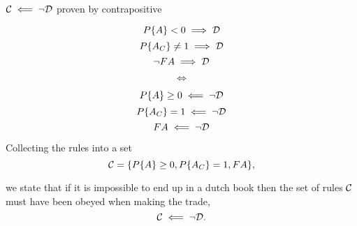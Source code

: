 \begin{frame}{$\mathcal{C}\impliedby\neg\mathcal{D}$ proven by contrapositive}
\begin{minipage}[]{\linewidth}
\begin{minipage}[]{0.45\linewidth}
$$P\{A\}<0\implies\mathcal{D}$$
$$P\{A_{C}\}\ne1\implies\mathcal{D}$$
$$\neg FA\implies \mathcal{D}$$
\end{minipage}
\hfill
\begin{minipage}{0.05\linewidth}
\centering
$$\iff$$
\end{minipage}
\hfill
\begin{minipage}[]{0.45\linewidth}
$$P\{A\}\ge0\impliedby\neg\mathcal{D}$$
$$P\{A_{C}\}=1\impliedby\neg\mathcal{D}$$
$$FA\impliedby \neg\mathcal{D}$$
\end{minipage}
\end{minipage}
\vfill
\begin{minipage}{\linewidth}
Collecting the rules into a set
\vspace{-7px}
$$\mathcal{C}=\{P\{A\}\ge0,P\{A_{C}\}=1, FA\},$$

\vspace{-7px}we state that if it is impossible to end up in a dutch book then the set of rules $\mathcal{C}$ must have been obeyed when making the trade,
\vspace{-5px}
$$\mathcal{C}\impliedby\neg\mathcal{D}.$$
\end{minipage}
\end{frame}

